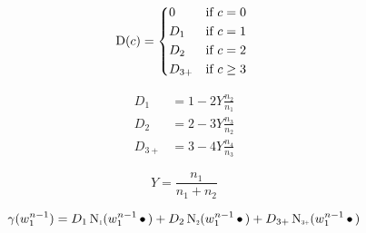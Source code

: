 \begin{draft}
\begin{equation}
  \Discount(c) =
    \begin{dcases*}
      0      & if $c = 0$ \\
      D_1    & if $c = 1$ \\
      D_2    & if $c = 2$ \\
      D_{3+} & if $c \geq 3$
    \end{dcases*}
\end{equation}

\begin{subequations}
  \begin{align}
    D_1    &= 1 - 2 Y \frac{n_2}{n_1} \\
    D_2    &= 2 - 3 Y \frac{n_3}{n_2} \\
    D_{3+} &= 3 - 4 Y \frac{n_4}{n_3}
  \end{align}
\end{subequations}

\begin{equation}
  Y = \frac{n_1}{n_1 + n_2}
\end{equation}

\begin{equation}
  \gamma(w_1^{n-1}) =   D_1    \ContCountI    (w_1^{n-1} \WSkp)
                      + D_2    \ContCountII   (w_1^{n-1} \WSkp)
                      + D_{3+} \ContCountIIIp (w_1^{n-1} \WSkp)
\end{equation}
\end{draft}
